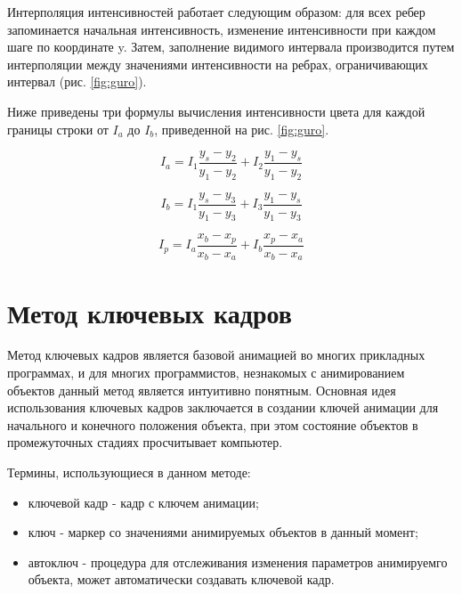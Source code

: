\newpage

\vspace{0.3cm}Интерполяция интенсивностей работает следующим образом: для всех ребер запоминается начальная интенсивность, изменение интенсивности при каждом шаге по координате y. Затем, заполнение видимого интервала производится путем интерполяции между значениями интенсивности на ребрах, ограничивающих интервал (рис. \ref{fig:guro}).

\vspace{0.3cm}Ниже приведены три формулы вычисления интенсивности цвета для каждой границы строки от $I_a$ до $I_b$, приведенной на рис. \ref{fig:guro}.

\begin{equation}
I_a = I_1\frac{y_s-y_2}{y_1-y_2} + I_2\frac{y_1-y_s}{y_1-y_2}
\end{equation}

\begin{equation}
I_b = I_1\frac{y_s-y_3}{y_1-y_3} + I_3\frac{y_1-y_s}{y_1-y_3}
\end{equation}

\begin{equation}
I_p = I_a\frac{x_b-x_p}{x_b-x_a} + I_b\frac{x_p-x_a}{x_b-x_a}
\end{equation}

\section{Метод ключевых кадров}
\hspace{0.6cm}Метод ключевых кадров является базовой анимацией во многих прикладных программах, и для многих программистов, незнакомых с анимированием объектов данный метод является интуитивно понятным. Основная идея использования ключевых кадров заключается в создании ключей анимации для начального и конечного положения объекта, при этом состояние объектов в промежуточных стадиях просчитывает компьютер.

\vspace{0.3cm}Термины, использующиеся в данном методе:
\begin{itemize}
	\item ключевой кадр - кадр с ключем анимации;
	\item ключ - маркер со значениями анимируемых объектов в данный момент;
	\item автоключ - процедура для отслеживания изменения параметров анимируемго объекта, может автоматически создавать ключевой кадр.
\end{itemize}

